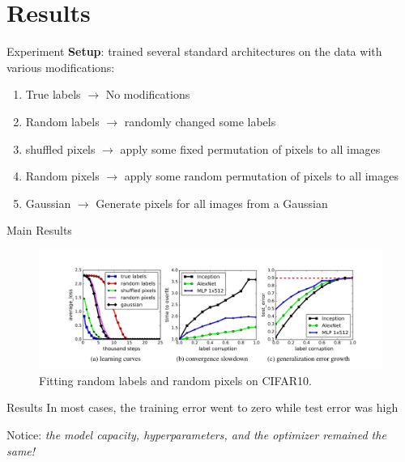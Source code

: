 \documentclass[10pt]{beamer}
\begin{document}
\section{Results}

\begin{frame}[fragile]{Experiment}
	\textbf{Setup}: trained several standard architectures on the data with various modifications:
	\begin{enumerate}
		\item True labels $\rightarrow$ No modifications
		\item Random labels $\rightarrow$ randomly changed some labels
		\item shuffled pixels $\rightarrow$ apply some fixed permutation of pixels to all images
		\item Random pixels $\rightarrow$ apply some random permutation of pixels to all images
		\item Gaussian $\rightarrow$ Generate pixels for all images from a Gaussian
	\end{enumerate}

\end{frame}

\begin{frame}[fragile]{Main Results}
		\begin{figure}
			\centering
		\centering
		\includegraphics[width=\linewidth]{fig1c}
		\caption{Fitting random labels and random pixels on CIFAR10.}
		\label{fig:corruptlabels}
		\end{figure}
\end{frame}

\begin{frame}[fragile]{Results}
	In most cases, the training error went to zero while test error was high
	
	\begin{alertblock}{Notice:}
		\emph{the model capacity, hyperparameters, and the optimizer remained the same!}
	\end{alertblock}

\end{frame}
\end{document}
